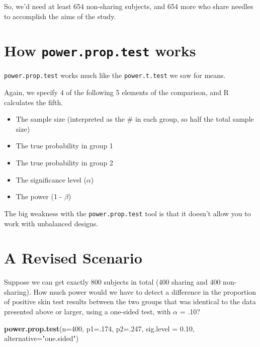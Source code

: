 \documentclass[
]{book}
\newenvironment{Shaded}{\begin{snugshade}}{\end{snugshade}}
\newcommand{\DataTypeTok}[1]{\textcolor[rgb]{0.13,0.29,0.53}{#1}}
\newcommand{\DecValTok}[1]{\textcolor[rgb]{0.00,0.00,0.81}{#1}}
\newcommand{\FloatTok}[1]{\textcolor[rgb]{0.00,0.00,0.81}{#1}}
\newcommand{\KeywordTok}[1]{\textcolor[rgb]{0.13,0.29,0.53}{\textbf{#1}}}
\newcommand{\NormalTok}[1]{#1}
\newcommand{\StringTok}[1]{\textcolor[rgb]{0.31,0.60,0.02}{#1}}
\providecommand{\tightlist}{%
  \setlength{\itemsep}{0pt}\setlength{\parskip}{0pt}}
\begin{document}
So, we'd need at least 654 non-sharing subjects, and 654 more who share needles to accomplish the aims of the study.

\hypertarget{how-power.prop.test-works}{%
\section{\texorpdfstring{How \texttt{power.prop.test} works}{How power.prop.test works}}\label{how-power.prop.test-works}}

\texttt{power.prop.test} works much like the \texttt{power.t.test} we saw for means.

Again, we specify 4 of the following 5 elements of the comparison, and R calculates the fifth.

\begin{itemize}
\tightlist
\item
  The sample size (interpreted as the \# in each group, so half the total sample size)
\item
  The true probability in group 1
\item
  The true probability in group 2
\item
  The significance level (\(\alpha\))
\item
  The power (1 - \(\beta\))
\end{itemize}

The big weakness with the \texttt{power.prop.test} tool is that it doesn't allow you to work with unbalanced designs.

\hypertarget{a-revised-scenario}{%
\section{A Revised Scenario}\label{a-revised-scenario}}

Suppose we can get exactly 800 subjects in total (400 sharing and 400 non-sharing). How much power would we have to detect a difference in the proportion of positive skin test results between the two groups that was identical to the data presented above or larger, using a one-sided test, with \(\alpha\) = .10?

\begin{Shaded}
\begin{Highlighting}[]
\KeywordTok{power.prop.test}\NormalTok{(}\DataTypeTok{n=}\DecValTok{400}\NormalTok{, }\DataTypeTok{p1=}\NormalTok{.}\DecValTok{174}\NormalTok{, }\DataTypeTok{p2=}\NormalTok{.}\DecValTok{247}\NormalTok{, }\DataTypeTok{sig.level =} \FloatTok{0.10}\NormalTok{,}
                \DataTypeTok{alternative=}\StringTok{"one.sided"}\NormalTok{)}
\end{Highlighting}
\end{Shaded}
\end{document}
